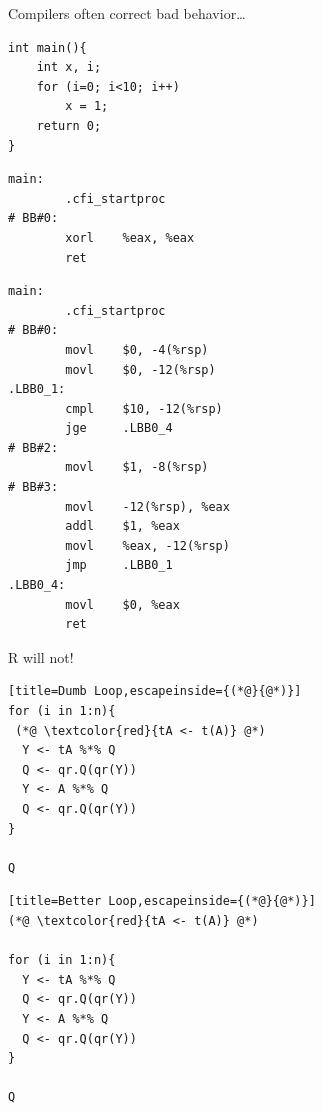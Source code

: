 \begin{frame}[fragile]{Compilers often correct bad behavior\dots}
  \begin{center}
\begin{minipage}{.4\textwidth}
\vspace{0pt}
\begin{lstlisting}[title=A Really Dumb Loop,language=Rcpp]
int main(){
    int x, i;
    for (i=0; i<10; i++)
        x = 1;
    return 0;
}
\end{lstlisting}
\begin{lstlisting}[language=shl,title=clang -O3 example.c]
main:
        .cfi_startproc
# BB#0:
        xorl    %eax, %eax
        ret
\end{lstlisting}
\end{minipage}
\begin{minipage}{.57\textwidth}
\begin{lstlisting}[language=shl,title=clang example.c]
main:               
        .cfi_startproc
# BB#0:
        movl    $0, -4(%rsp)
        movl    $0, -12(%rsp)
.LBB0_1:            
        cmpl    $10, -12(%rsp)
        jge     .LBB0_4
# BB#2:             
        movl    $1, -8(%rsp)
# BB#3:             
        movl    -12(%rsp), %eax
        addl    $1, %eax
        movl    %eax, -12(%rsp)
        jmp     .LBB0_1
.LBB0_4:
        movl    $0, %eax
        ret
\end{lstlisting}
\end{minipage}

  \end{center}
\end{frame}
  
  
  
\begin{frame}[fragile]{R will not!}
    \begin{center}
\begin{minipage}[t]{.45\textwidth}
\begin{lstlisting}[title=Dumb Loop,escapeinside={(*@}{@*)}]
for (i in 1:n){
 (*@ \textcolor{red}{tA <- t(A)} @*)
  Y <- tA %*% Q
  Q <- qr.Q(qr(Y))
  Y <- A %*% Q
  Q <- qr.Q(qr(Y))
}  

Q
\end{lstlisting}
\end{minipage}
\begin{minipage}[t]{.45\textwidth}
\begin{lstlisting}[title=Better Loop,escapeinside={(*@}{@*)}]
(*@ \textcolor{red}{tA <- t(A)} @*)
 
for (i in 1:n){
  Y <- tA %*% Q
  Q <- qr.Q(qr(Y))
  Y <- A %*% Q
  Q <- qr.Q(qr(Y))
}  

Q
\end{lstlisting}
\end{minipage}
\end{center}
\end{frame}





